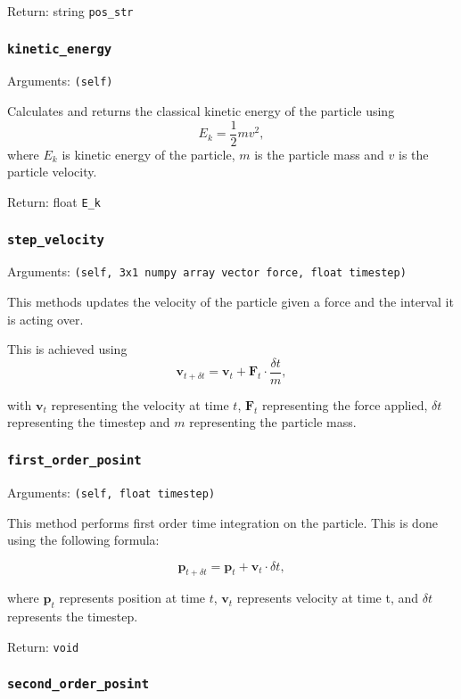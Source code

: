\documentclass[a4paper, 11pt, british, left=1in, right=1in, top=0.3in, bottom=1in]{article}
\begin{document}
	Return: string \texttt{pos\_str}
	
	\subsubsection{\texttt{kinetic\_energy}}
	
	Arguments: \texttt{(self)}
	
	Calculates and returns the classical kinetic energy of the particle using $$E_k = \dfrac{1}{2}mv^2,$$ where $E_k$ is kinetic energy of the particle, $m$ is the particle mass and $v$ is the particle velocity.
	
	Return: float \texttt{E\_k}
	
	\subsubsection{\texttt{step\_velocity}}
	
	Arguments: \texttt{(self, 3x1 numpy array vector force, float timestep)}
	
	This methods updates the velocity of the particle given a force and the interval it is acting over. 
	
	This is achieved using $$\textbf{v}_{t+\delta t} = \textbf{v}_t + \textbf{F}_t\cdot\frac{\delta t}{m},$$
	
	with $\textbf{v}_t$ representing the velocity at time $t$, $\textbf{F}_t$ representing the force applied, $\delta t$ representing the timestep and $m$ representing the particle mass. 
	\subsubsection{\texttt{first\_order\_posint}}
	
	Arguments: \texttt{(self, float timestep)}
	
	This method performs first order time integration on the particle. This is done using the following formula:
	
	$$\textbf{p}_{t+\delta t} = \textbf{p}_t + \textbf{v}_t \cdot \delta t, $$
	
	where $\textbf{p}_t$ represents position at time $t$, $\textbf{v}_t$ represents velocity at time t, and $\delta t$ represents the timestep. 
	
	Return: \texttt{void}	
	
	\subsubsection{\texttt{second\_order\_posint}}
	
\end{document}
